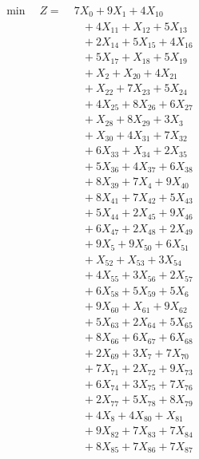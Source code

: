 \documentclass[a4paper,10pt]{article}
\begin{document}
\allowdisplaybreaks
{\small
\begin{align}
\min \quad Z = &\; 7X_{0} + 9X_{1} + 4X_{10} \\[0.5ex]
&\quad  + 4X_{11} + X_{12} + 5X_{13} \\[0.5ex]
&\quad  + 2X_{14} + 5X_{15} + 4X_{16} \\[0.5ex]
&\quad  + 5X_{17} + X_{18} + 5X_{19} \\[0.5ex]
&\quad  + X_{2} + X_{20} + 4X_{21} \\[0.5ex]
&\quad  + X_{22} + 7X_{23} + 5X_{24} \\[0.5ex]
&\quad  + 4X_{25} + 8X_{26} + 6X_{27} \\[0.5ex]
&\quad  + X_{28} + 8X_{29} + 3X_{3} \\[0.5ex]
&\quad  + X_{30} + 4X_{31} + 7X_{32} \\[0.5ex]
&\quad  + 6X_{33} + X_{34} + 2X_{35} \\[0.5ex]
&\quad  + 5X_{36} + 4X_{37} + 6X_{38} \\[0.5ex]
&\quad  + 8X_{39} + 7X_{4} + 9X_{40} \\[0.5ex]
&\quad  + 8X_{41} + 7X_{42} + 5X_{43} \\[0.5ex]
&\quad  + 5X_{44} + 2X_{45} + 9X_{46} \\[0.5ex]
&\quad  + 6X_{47} + 2X_{48} + 2X_{49} \\[0.5ex]
&\quad  + 9X_{5} + 9X_{50} + 6X_{51} \\[0.5ex]
&\quad  + X_{52} + X_{53} + 3X_{54} \\[0.5ex]
&\quad  + 4X_{55} + 3X_{56} + 2X_{57} \\[0.5ex]
&\quad  + 6X_{58} + 5X_{59} + 5X_{6} \\[0.5ex]
&\quad  + 9X_{60} + X_{61} + 9X_{62} \\[0.5ex]
&\quad  + 5X_{63} + 2X_{64} + 5X_{65} \\[0.5ex]
&\quad  + 8X_{66} + 6X_{67} + 6X_{68} \\[0.5ex]
&\quad  + 2X_{69} + 3X_{7} + 7X_{70} \\[0.5ex]
&\quad  + 7X_{71} + 2X_{72} + 9X_{73} \\[0.5ex]
&\quad  + 6X_{74} + 3X_{75} + 7X_{76} \\[0.5ex]
&\quad  + 2X_{77} + 5X_{78} + 8X_{79} \\[0.5ex]
&\quad  + 4X_{8} + 4X_{80} + X_{81} \\[0.5ex]
&\quad  + 9X_{82} + 7X_{83} + 7X_{84} \\[0.5ex]
&\quad  + 8X_{85} + 7X_{86} + 7X_{87} \\[0.5ex]

\end{align}}
\end{document}
